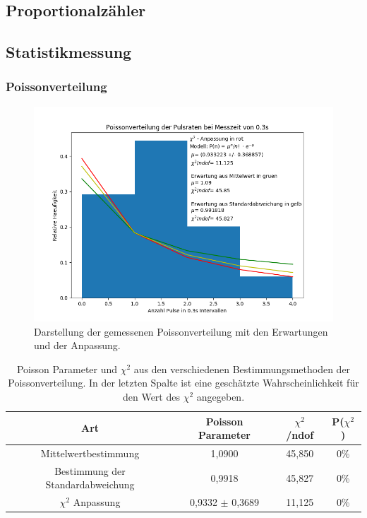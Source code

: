 \documentclass[12pt,a4paper]{article}
\begin{document}
\subsection{Proportionalzähler}
\subsection{Statistikmessung}

\subsubsection{Poissonverteilung}
\begin{figure}
\centering
\includegraphics[scale=0.8]{Bilder/poisson.PNG}
\caption{Darstellung der gemessenen Poissonverteilung mit den Erwartungen und der Anpassung.}
\label{fig:Poisson}
\end{figure}

\begin{table}
\centering
\begin{tabular}{|c|c|c|c|}
\hline 
Art & Poisson Parameter & $\chi ^2$ /ndof & P($\chi ^2$) \\ 
\hline 
Mittelwertbestimmung & 1,0900 & 45,850 & 0\% \\ 
\hline 
Bestimmung der Standardabweichung & 0,9918 & 45,827 & 0\% \\ 
\hline 
$\chi ^2$ Anpassung & 0,9332 $\pm$ 0,3689 & 11,125 & 0\% \\ 
\hline 
\end{tabular} 
\caption{Poisson Parameter und $\chi ^2$ aus den verschiedenen Bestimmungsmethoden der Poissonverteilung. In der letzten Spalte ist eine geschätzte Wahrscheinlichkeit für den Wert des $\chi ^2$ angegeben.}
\label{tab:Poisson}
\end{table}
\end{document}
